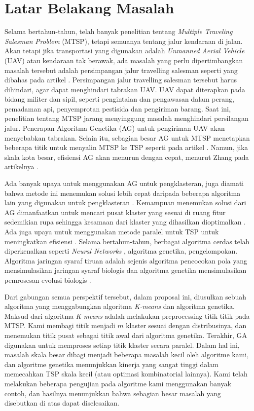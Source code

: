 \section{Latar Belakang Masalah}

Selama bertahun-tahun, telah banyak penelitian tentang \textit{Multiple Traveling Salesman Problem} (MTSP), tetapi semuanya tentang jalur kendaraan di jalan. Akan tetapi jika transportasi yang digunakan adalah \textit{Unmanned Aerial Vehicle} (UAV) atau kendaraan tak berawak, ada masalah yang perlu dipertimbangkan masalah tersebut adalah persimpangan jalur travelling salesman seperti yang dibahas pada artikel \cite{inproceedings}. Persimpangan jalur travelling salesman tersebut harus dihindari, agar dapat menghindari tabrakan UAV. UAV dapat diterapkan pada bidang militer dan sipil, seperti pengintaian dan pengawasan dalam perang, pemadaman api, penyemprotan pestisida dan pengiriman barang.
Saat ini, penelitian tentang MTSP jarang menyinggung masalah menghindari persilangan jalur. Penerapan Algoritma Genetika (AG) untuk pengiriman UAV akan menyebabkan tabrakan. Selain itu, sebagian besar AG untuk MTSP menetapkan beberapa titik untuk menyalin MTSP ke TSP seperti pada artikel \cite{shengping2002hybrid}. Namun, jika skala kota besar, efisiensi AG akan menurun dengan cepat, menurut Zhang pada artikelnya \cite{zhang2014parallel}.

Ada banyak upaya untuk menggunakan AG untuk pengklasteran, juga diamati bahwa metode ini menemukan solusi lebih cepat daripada beberapa algoritma lain yang digunakan untuk pengklasteran \cite{krishna1999genetic}. Kemampuan menemukan solusi dari AG dimanfaatkan untuk mencari pusat klaster yang sesuai di ruang fitur sedemikian rupa sehingga kesamaan dari klaster yang dihasilkan dioptimalkan \cite{maii2000genetic}. Ada juga upaya untuk menggunakan metode paralel untuk TSP untuk meningkatkan efisiensi \cite{li2016parallel}. Selama bertahun-tahun, berbagai algoritma cerdas telah diperkenalkan seperti  \textit{Neural Networks} \cite{song2015asynchronous,zhang2015universality,pan2012spiking}, algoritma genetika, pengelompokan. Algoritma jaringan syaraf tiruan adalah sejenis algoritma pencocokan pola yang mensimulasikan jaringan syaraf biologis dan algoritma genetika mensimulasikan pemrosesan evolusi biologis \cite{liu2015implementation,zeng2014spiking,xu2016probe,zhang2014efficient}.

Dari gabungan semua perspektif tersebut, dalam proposal ini, diusulkan sebuah algoritma yang menggabungkan algoritma \textit{K-means} dan algoritma genetika. Maksud dari algoritma \textit{K-means} adalah melakukan preprocessing titik-titik pada MTSP. Kami membagi titik menjadi $m$ klaster sesuai dengan distribusinya, dan menemukan titik pusat sebagai titik awal dari algoritma genetika. Terakhir, GA digunakan untuk memproses setiap titik klaster secara paralel. Dalam hal ini, masalah skala besar dibagi menjadi beberapa masalah kecil oleh algoritme kami, dan algoritme genetika menunjukkan kinerja yang sangat tinggi dalam memecahkan TSP skala kecil (atau optimasi kombinatorial lainnya). Kami telah melakukan beberapa pengujian pada algoritme kami menggunakan banyak contoh, dan hasilnya menunjukkan bahwa sebagian besar masalah yang disebutkan di atas dapat diselesaikan.